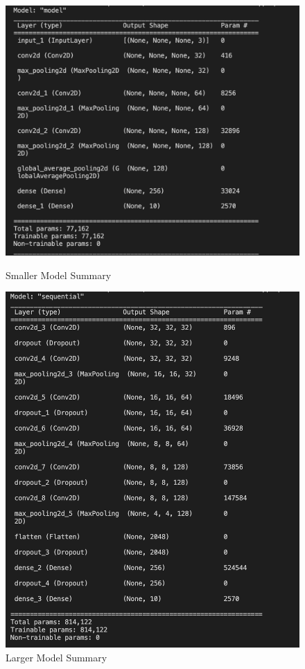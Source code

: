 \documentclass{article}
\begin{document}
\begin{figure}[!htb]
		\includegraphics[width = \linewidth]{model_1_params.png}
		\caption{Smaller Model Summary}
	\endminipage\hfill
		\includegraphics[width = \linewidth]{model_2_params.png}
		\caption{Larger Model Summary}
	\endminipage\hfill	
\end{figure}
\end{document}
